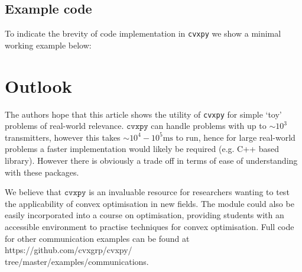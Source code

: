 \documentclass[twocolumn,secnumarabic,amssymb, nobibnotes, aps, prl,superscriptaddress]{revtex4-1}
\begin{document}
\subsection{Example code}
\noindent To indicate the brevity of code implementation in \texttt{cvxpy} we show a minimal working example below: 

\section{Outlook}
\noindent The authors hope that this article shows the utility of \texttt{cvxpy} for simple `toy' problems of real-world relevance. $\texttt{cvxpy}$ can handle problems with up to $\sim 10^3$ transmitters, however this takes $\sim 10^{4}-10^{5}\text{ms}$ to run, hence for large real-world problems a faster implementation would likely be required (e.g. C++ based library). However there is obviously a trade off in terms of ease of understanding with these packages.

We believe that $\texttt{cvxpy}$ is an invaluable resource for researchers wanting to test the applicability of convex optimisation in new fields. The module could also be easily incorporated into a course on optimisation, providing students with an accessible environment to practise techniques for convex optimisation. Full code for other communication examples can be found at https://github.com/cvxgrp/cvxpy/\\tree/master/examples/communications.


\end{document}
